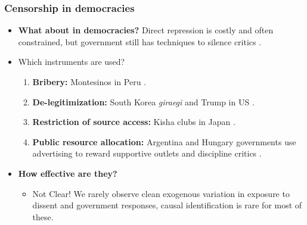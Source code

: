 \documentclass[10pt,aspectratio=169]{beamer}
\begin{document}
\begin{frame}
\frametitle{Censorship in democracies}

\begin{itemize}
 \item \textbf{What about in democracies?}
    Direct repression is costly and often constrained, but government still has techniques to silence critics {\footnotesize\color{gray}\citep{Censor-Pratt-AER}}.
    \vspace{0.2cm}
\item Which instruments are used?

\begin{enumerate}
    \item \textbf{Bribery:} Montesinos in Peru {\footnotesize\color{gray}\citep{Peru-Macmillan-JEP}}.
    \item \textbf{De-legitimization:} South Korea \textit{giraegi} and Trump in US {\footnotesize\color{gray}\citep{KoreaJour-Shin-Journalism, PressCriticism-Carlson-Journalism}}.
    \item \textbf{Restriction of source access:} Kisha clubs in Japan {\footnotesize\color{gray}\citep{Kisha-Freedom}}.
    \item \textbf{Public resource allocation:} Argentina and Hungary governments use \alert{advertising} to \alert{reward} supportive outlets and \alert{discipline} critics {\footnotesize\color{gray}\citep{ArgCorr-DiTella-AEJAE, MediaCaptures-Zeidl-Econometrica}}.
\end{enumerate}

\vspace{0.2cm}
\item \textbf{How effective are they?}
\begin{itemize}
  \item \alert{Not Clear!} We rarely observe clean exogenous variation in exposure to dissent and government responses, causal identification is rare for most of these.
\end{itemize}
\end{itemize}
\end{frame}
\end{document}
